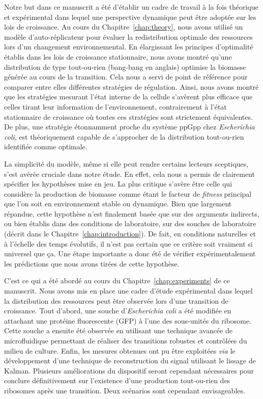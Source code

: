 Notre but dans ce manuscrit a été d'établir un cadre de travail à la fois théorique et expérimental dans lequel une perspective dynamique peut être adoptée sur les lois de croissance.
Au cours du Chapitre~\ref{chap:theory}, nous avons utilisé un modèle d'auto-réplicateur pour évaluer la redistribution optimale des ressources lors d'un changement environnemental.
En élargissant les principes d'optimalité établis dans les lois de croissance stationnaire, nous avons montré qu'une distribution de type tout-ou-rien (bang-bang en anglais) optimise la biomasse générée au cours de la transition.
Cela nous a servi de point de référence pour comparer entre elles différentes stratégies de régulation.
Ainsi, nous avons montré que les stratégies mesurant l'état interne de la cellule s'avèrent plus efficace que celles tirant leur information de l'environnement, contrairement à l'état stationnaire de croissance où toutes ces stratégies sont strictement équivalentes.
De plus, une stratégie étonnamment proche du système ppGpp chez \textit{Escherichia coli}, est théoriquement capable de s'approcher de la distribution tout-ou-rien identifiée comme optimale.

La simplicité du modèle, même si elle peut rendre certains lecteurs sceptiques, s'est avérée cruciale dans notre étude.
En effet, cela nous a permis de clairement spécifier les hypothèses mise en jeu.
La plus critique s'avère être celle qui considère la production de biomasse comme étant le facteur de \textit{fitness} principal que l'on soit en environnement stable ou dynamique.
Bien que largement répandue, cette hypothèse n'est finalement basée que sur des arguments indirects, ou bien établis dans des conditions de laboratoire, sur des souches de laboratoire (décrit dans le Chapitre~\ref{chap:introduction}).
De fait, en conditions naturelles et à l'échelle des temps évolutifs, il n'est pas certain que ce critère soit vraiment si universel que ça.
Une étape importante a donc été de vérifier expérimentalement les prédictions que nous avons tirées de cette hypothèse.

C'est ce qui a été abordé au cours du Chapitre~\ref{chap:experiments} de ce manuscrit.
Nous avons mis en place une cadre d'étude expérimental dans lequel la distribution des ressources peut être observée lors d'une transition de croissance.
Tout d'abord, une souche d'\textit{Escherichia coli} a été modifiée en attachant une protéine fluorescente (GFP) à l'une des sous-unités du ribosome.
Cette souche a ensuite été observée en utilisant une technique avancée de microfluidique permettant de réaliser des transitions robustes et contrôlées du milieu de culture.
Enfin, les mesures obtenues ont pu être exploitées \textit{via} le développement d'une technique de reconstruction du signal utilisant le lissage de Kalman.
Plusieurs améliorations du dispositif seront cependant nécessaires pour conclure définitivement sur l'existence d'une production tout-ou-rien des ribosomes après une transition.
Deux scénarios sont cependant envisageables.

